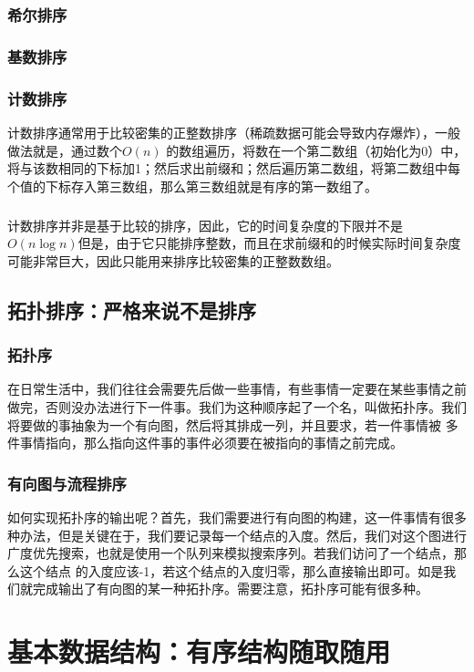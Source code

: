 \documentclass[12pt,a4paper,UTF16]{ctexbook}
\theoremstyle{plain}
\begin{document}
\subsection{希尔排序}
\subsection{基数排序}
\subsection{计数排序}
计数排序通常用于比较密集的正整数排序（稀疏数据可能会导致内存爆炸），一般做法就是，通过数个$O(n)$
的数组遍历，将数在一个第二数组（初始化为0）中，将与该数相同的下标加1；然后求出前缀和；然后遍历第二数组，将第二数组中每个值的下标存入第三数组，那么第三数组就是有序的第一数组了。
\paragraph{}计数排序并非是基于比较的排序，因此，它的时间复杂度的下限并不是$O(n\log n)$但是，由于它只能排序整数，而且在求前缀和的时候实际时间复杂度可能非常巨大，因此只能用来排序比较密集的正整数数组。
\section{拓扑排序：严格来说不是排序}
\subsection{拓扑序}
在日常生活中，我们往往会需要先后做一些事情，有些事情一定要在某些事情之前做完，否则没办法进行下一件事。我们为这种顺序起了一个名，叫做拓扑序。我们将要做的事抽象为一个有向图，然后将其排成一列，并且要求，若一件事情被
多件事情指向，那么指向这件事的事件必须要在被指向的事情之前完成。
\subsection{有向图与流程排序}
如何实现拓扑序的输出呢？首先，我们需要进行有向图的构建，这一件事情有很多种办法，但是关键在于，我们要记录每一个结点的入度。然后，我们对这个图进行广度优先搜索，也就是使用一个队列来模拟搜索序列。若我们访问了一个结点，那么这个结点
的入度应该-1，若这个结点的入度归零，那么直接输出即可。如是我们就完成输出了有向图的某一种拓扑序。需要注意，拓扑序可能有很多种。

\chapter{基本数据结构：有序结构随取随用}
\end{document}
